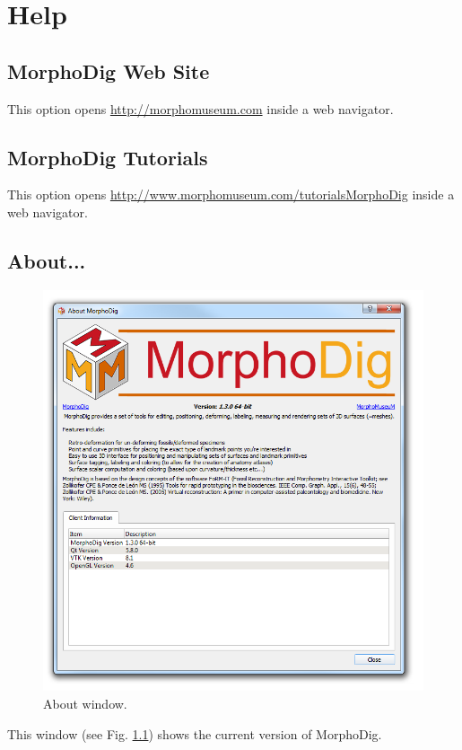 
\chapter{Help}

\minitoc 

\section{MorphoDig Web Site } 
This option opens \url{http://morphomuseum.com} inside a web navigator.
\section{MorphoDig Tutorials } 
This option opens \url{http://www.morphomuseum.com/tutorialsMorphoDig}  inside a web navigator.
\section{About...} 
\begin{figure}
  \centering
  \includegraphics[scale=0.5]{images/16/about.png} 
	\caption{About window.}
\label{about}
 
\end{figure}

This window (see Fig. \ref{about}) shows the current version of MorphoDig.
